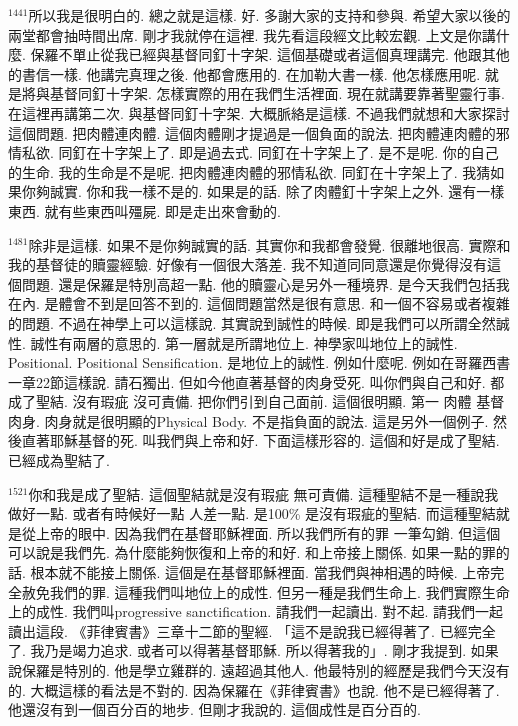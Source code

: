 \documentclass{book}
\begin{document}
$^{1441}$所以我是很明白的.
總之就是這樣.
好.
多謝大家的支持和參與.
希望大家以後的兩堂都會抽時間出席.
剛才我就停在這裡.
我先看這段經文比較宏觀.
上文是你講什麼.
保羅不單止從我已經與基督同釘十字架.
這個基礎或者這個真理講完.
他跟其他的書信一樣.
他講完真理之後.
他都會應用的.
在加勒大書一樣.
他怎樣應用呢.
就是將與基督同釘十字架.
怎樣實際的用在我們生活裡面.
現在就講要靠著聖靈行事.
在這裡再講第二次.
與基督同釘十字架.
大概脈絡是這樣.
不過我們就想和大家探討這個問題.
把肉體連肉體.
這個肉體剛才提過是一個負面的說法.
把肉體連肉體的邪情私欲.
同釘在十字架上了.
即是過去式.
同釘在十字架上了.
是不是呢.
你的自己的生命.
我的生命是不是呢.
把肉體連肉體的邪情私欲.
同釘在十字架上了.
我猜如果你夠誠實.
你和我一樣不是的.
如果是的話.
除了肉體釘十字架上之外.
還有一樣東西.
就有些東西叫殭屍.
即是走出來會動的.

$^{1481}$除非是這樣.
如果不是你夠誠實的話.
其實你和我都會發覺.
很離地很高.
實際和我的基督徒的贖靈經驗.
好像有一個很大落差.
我不知道同同意還是你覺得沒有這個問題.
還是保羅是特別高超一點.
他的贖靈心是另外一種境界.
是今天我們包括我在內.
是體會不到是回答不到的.
這個問題當然是很有意思.
和一個不容易或者複雜的問題.
不過在神學上可以這樣說.
其實說到誠性的時候.
即是我們可以所謂全然誠性.
誠性有兩層的意思的.
第一層就是所謂地位上.
神學家叫地位上的誠性.
Positional.
Positional Sensification.
是地位上的誠性.
例如什麼呢.
例如在哥羅西書一章22節這樣說.
請石獨出.
但如今他直著基督的肉身受死.
叫你們與自己和好.
都成了聖結.
沒有瑕疵 沒可責備.
把你們引到自己面前.
這個很明顯.
第一 肉體 基督肉身.
肉身就是很明顯的Physical Body.
不是指負面的說法.
這是另外一個例子.
然後直著耶穌基督的死.
叫我們與上帝和好.
下面這樣形容的.
這個和好是成了聖結.
已經成為聖結了.

$^{1521}$你和我是成了聖結.
這個聖結就是沒有瑕疵 無可責備.
這種聖結不是一種說我做好一點.
或者有時候好一點 人差一點.
是100\% 是沒有瑕疵的聖結.
而這種聖結就是從上帝的眼中.
因為我們在基督耶穌裡面.
所以我們所有的罪 一筆勾銷.
但這個可以說是我們先.
為什麼能夠恢復和上帝的和好.
和上帝接上關係.
如果一點的罪的話.
根本就不能接上關係.
這個是在基督耶穌裡面.
當我們與神相遇的時候.
上帝完全赦免我們的罪.
這種我們叫地位上的成性.
但另一種是我們生命上.
我們實際生命上的成性.
我們叫progressive sanctification.
請我們一起讀出.
對不起.
請我們一起讀出這段.
《菲律賓書》三章十二節的聖經.
「這不是說我已經得著了.
已經完全了.
我乃是竭力追求.
或者可以得著基督耶穌.
所以得著我的」.
剛才我提到.
如果說保羅是特別的.
他是學立雞群的.
遠超過其他人.
他最特別的經歷是我們今天沒有的.
大概這樣的看法是不對的.
因為保羅在《菲律賓書》也說.
他不是已經得著了.
他還沒有到一個百分百的地步.
但剛才我說的.
這個成性是百分百的.
\end{document}
